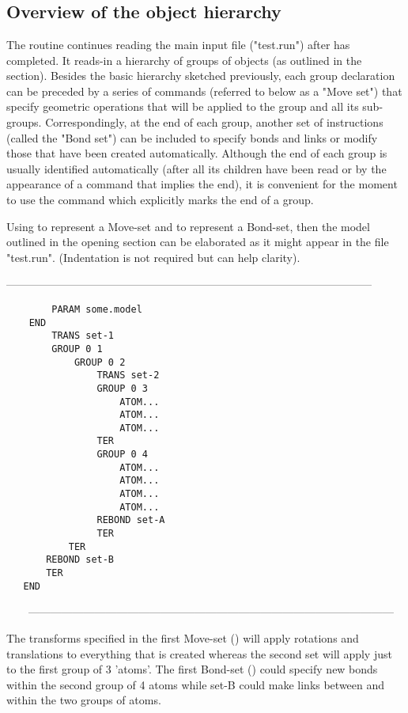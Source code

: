 \section{}

\subsection{Overview of the object hierarchy}

The  routine continues reading the main input file ("test.run")
after  has completed.  It reads-in a hierarchy of groups of objects
(as outlined in the  section).   Besides the basic hierarchy sketched
previously, each group declaration can be preceded by a series of commands
(referred to below as a "Move set") that specify geometric operations that
will be applied to the group and all its sub-groups.  Correspondingly, at the
end of each group, another set of instructions (called the "Bond set") can
be included to specify bonds and links or modify those that have been created
automatically.    Although the end of each group is usually identified
automatically (after all its children have been read or by the appearance of
a command that implies the end), it is convenient for the moment to use the
 command which explicitly marks the end of a group. 

Using  to represent a Move-set and  to represent a
Bond-set, then the model outlined in the opening section can be elaborated
as it might appear in the file "test.run".  (Indentation is not required but
can help clarity).
\begin{singlespace}
---------------------------------------------------------------------------------------------------
\begin{verbatim}
        PARAM some.model
    END
        TRANS set-1
        GROUP 0 1
            GROUP 0 2
                TRANS set-2
                GROUP 0 3
                    ATOM...
                    ATOM...
                    ATOM...
                TER
                GROUP 0 4
                    ATOM...
                    ATOM...
                    ATOM...
                    ATOM...
                REBOND set-A
                TER
           TER
       REBOND set-B
       TER
   END
\end{verbatim}
\ \ \ \ ---------------------------------------------------------------------------------------------------
\end{singlespace}
The transforms specified in the first Move-set () will apply rotations
and translations to everything that is created whereas the second set will apply
just to the first group of 3 'atoms'.   The first Bond-set ()
could specify new bonds within the second group of 4 atoms while set-B could 
make links between and within the two groups of atoms.

